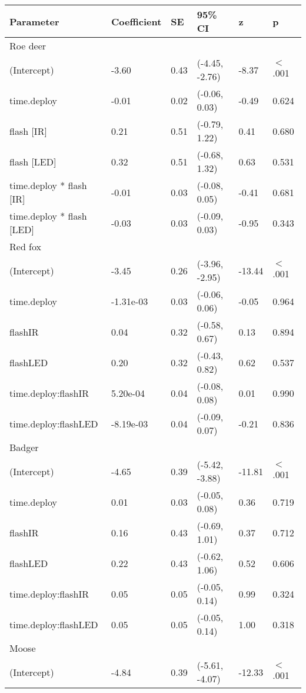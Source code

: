 \begin{table}[ht]
\centering
\begin{tabular}{llllll}
  \hline
Parameter & Coefficient & SE & 95\% CI & z & p \\ 
  \hline
Roe deer &  &  &  &  &        \\ 
  (Intercept) & -3.60 & 0.43 & (-4.45, -2.76) & -8.37 & $<$ .001 \\ 
  time.deploy & -0.01 & 0.02 & (-0.06,  0.03) & -0.49 & 0.624  \\ 
  flash [IR] & 0.21 & 0.51 & (-0.79,  1.22) & 0.41 & 0.680  \\ 
  flash [LED] & 0.32 & 0.51 & (-0.68,  1.32) & 0.63 & 0.531  \\ 
  time.deploy * flash [IR] & -0.01 & 0.03 & (-0.08,  0.05) & -0.41 & 0.681  \\ 
  time.deploy * flash [LED] & -0.03 & 0.03 & (-0.09,  0.03) & -0.95 & 0.343  \\ 
  Red fox &  &  &  &  &        \\ 
  (Intercept) & -3.45 & 0.26 & (-3.96, -2.95) & -13.44 & $<$ .001 \\ 
  time.deploy & -1.31e-03 & 0.03 & (-0.06,  0.06) & -0.05 & 0.964  \\ 
  flashIR & 0.04 & 0.32 & (-0.58,  0.67) & 0.13 & 0.894  \\ 
  flashLED & 0.20 & 0.32 & (-0.43,  0.82) & 0.62 & 0.537  \\ 
  time.deploy:flashIR & 5.20e-04 & 0.04 & (-0.08,  0.08) & 0.01 & 0.990  \\ 
  time.deploy:flashLED & -8.19e-03 & 0.04 & (-0.09,  0.07) & -0.21 & 0.836  \\ 
  Badger &  &  &  &  &        \\ 
  (Intercept) & -4.65 & 0.39 & (-5.42, -3.88) & -11.81 & $<$ .001 \\ 
  time.deploy & 0.01 & 0.03 & (-0.05,  0.08) & 0.36 & 0.719  \\ 
  flashIR & 0.16 & 0.43 & (-0.69,  1.01) & 0.37 & 0.712  \\ 
  flashLED & 0.22 & 0.43 & (-0.62,  1.06) & 0.52 & 0.606  \\ 
  time.deploy:flashIR & 0.05 & 0.05 & (-0.05,  0.14) & 0.99 & 0.324  \\ 
  time.deploy:flashLED & 0.05 & 0.05 & (-0.05,  0.14) & 1.00 & 0.318  \\ 
  Moose &  &  &  &  &        \\ 
  (Intercept) & -4.84 & 0.39 & (-5.61, -4.07) & -12.33 & $<$ .001 \\ 

\end{tabular}
\end{table}
